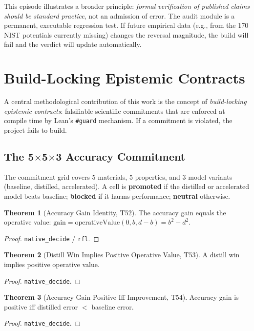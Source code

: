 \documentclass[11pt,a4paper]{article}
\theoremstyle{definition}
\newtheorem{theorem}{Theorem}[section]
\theoremstyle{plain}
\begin{document}
This episode illustrates a broader principle: \emph{formal verification of published claims should be standard practice}, not an admission of error. The audit module is a permanent, executable regression test. If future empirical data (e.g., from the 170 NIST potentials currently missing) changes the reversal magnitude, the build will fail and the verdict will update automatically.

\section{Build-Locking Epistemic Contracts}
\label{sec:contracts}

A central methodological contribution of this work is the concept of \emph{build-locking epistemic contracts}: falsifiable scientific commitments that are enforced at compile time by Lean's \texttt{\#guard} mechanism. If a commitment is violated, the project fails to build.

\subsection{The 5$\times$5$\times$3 Accuracy Commitment}
\label{subsec:5x5x3}

The commitment grid covers 5 materials, 5 properties, and 3 model variants (baseline, distilled, accelerated). A cell is \textbf{promoted} if the distilled or accelerated model beats baseline; \textbf{blocked} if it harms performance; \textbf{neutral} otherwise.

\begin{theorem}[Accuracy Gain Identity, T52]
\label{thm:gainid}
The accuracy gain equals the operative value: $\text{gain} = \text{operativeValue}(0, b, d-b) = b^2 - d^2$.
\end{theorem}
\begin{proof}
\texttt{native\_decide} / \texttt{rfl}.
\end{proof}

\begin{theorem}[Distill Win Implies Positive Operative Value, T53]
\label{thm:distillwin}
A distill win implies positive operative value.
\end{theorem}
\begin{proof}
\texttt{native\_decide}.
\end{proof}

\begin{theorem}[Accuracy Gain Positive Iff Improvement, T54]
\label{thm:iff}
Accuracy gain is positive iff distilled error $<$ baseline error.
\end{theorem}
\begin{proof}
\texttt{native\_decide}.
\end{proof}
\end{document}
